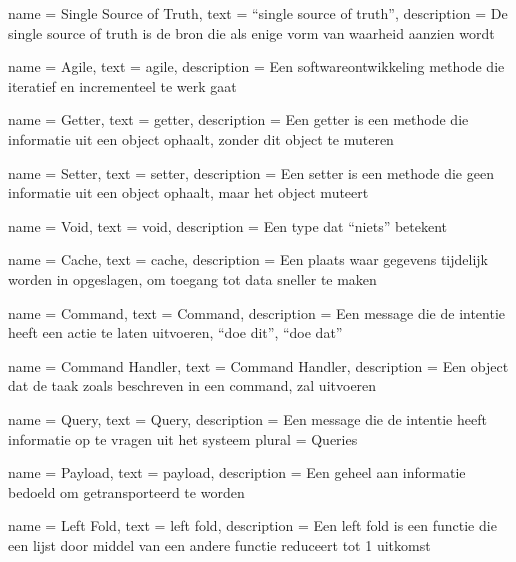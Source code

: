{
  name = {Single Source of Truth},
  text = ``single source of truth'',
  description = {De single source of truth is de bron die als enige vorm van waarheid aanzien wordt}
}

{
  name = Agile,
  text = agile,
  description = {Een softwareontwikkeling methode die iteratief en incrementeel te werk gaat}
}

{
  name = Getter,
  text = getter,
  description = {Een getter is een methode die informatie uit een object ophaalt, zonder dit object te muteren}
}

{
  name = Setter,
  text = setter,
  description = {Een setter is een methode die geen informatie uit een object ophaalt, maar het object muteert}
}

{
  name = Void,
  text = void,
  description = {Een type dat ``niets'' betekent}
}

{
  name = Cache,
  text = cache,
  description = {Een plaats waar gegevens tijdelijk worden in opgeslagen, om toegang tot data sneller te maken}
}

{
  name = Command,
  text = Command,
  description = {Een message die de intentie heeft een actie te laten uitvoeren, ``doe dit'', ``doe dat''}
}

{
  name = {Command Handler},
  text = {Command Handler},
  description = {Een object dat de taak zoals beschreven in een command, zal uitvoeren}
}

{
  name = Query,
  text = Query,
  description = {Een message die de intentie heeft informatie op te vragen uit het systeem}
  plural = Queries
}

{
  name = Payload,
  text = payload,
  description = {Een geheel aan informatie bedoeld om getransporteerd te worden}
}

{
  name = {Left Fold},
  text = {left fold},
  description = {Een left fold is een functie die een lijst door middel van een andere functie reduceert tot 1 uitkomst}
}


\printglossary[type=\acronymtype,title={Lijst van acroniemen}]

\printglossary
{}
